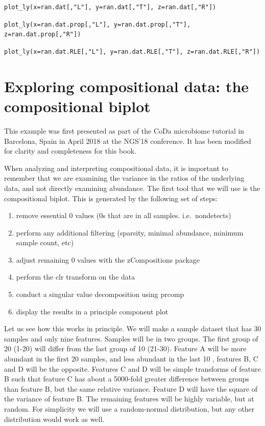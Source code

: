 \documentclass[
  onecolumn]{article}
\providecommand{\tightlist}{%
  \setlength{\itemsep}{0pt}\setlength{\parskip}{0pt}}
\begin{document}
\texttt{plot\_ly(x=ran.dat[,"L"], y=ran.dat[,"T"], z=ran.dat[,"R"])}

\texttt{plot\_ly(x=ran.dat.prop[,"L"], y=ran.dat.prop[,"T"], z=ran.dat.prop[,"R"])}

\texttt{plot\_ly(x=ran.dat.RLE[,"L"], y=ran.dat.RLE[,"T"], z=ran.dat.RLE[,"R"])}

\hypertarget{biplot}{%
\section{Exploring compositional data: the compositional biplot}\label{biplot}}

\hspace{2cm}\begin{minipage}[ct]{10cm}
\parskip=5pt
\parindent=5pt
This example was first presented as part of the CoDa microbiome tutorial in Barcelona, Spain in April 2018 at the NGS'18 conference.  It has been modified for clarity and completeness for this book.
\end{minipage}
\vspace{1cm}

When analyzing and interpreting compositional data, it is important to remember that we are examining the variance in the ratios of the underlying data, and not directly examining abundance. The first tool that we will use is the compositional biplot. This is generated by the following set of steps:

\begin{enumerate}
\def\labelenumi{\arabic{enumi}.}
\tightlist
\item
  remove essential 0 values (0s that are in all samples. i.e.~nondetects)
\item
  perform any additional filtering (sparsity, minimal abundance, minimum sample count, etc)
\item
  adjust remaining 0 values with the zCompositions package
\item
  perform the clr transform on the data
\item
  conduct a singular value decomposition using prcomp
\item
  display the results in a principle component plot
\end{enumerate}

Let us see how this works in principle. We will make a sample dataset that has 30 samples and only nine features. Samples will be in two groups. The first group of 20 (1-20) will differ from the last group of 10 (21-30). Feature A will be more abundant in the first 20 samples, and less abundant in the last 10 , features B, C and D will be the opposite. Features C and D will be simple transforms of feature B such that feature C has about a 5000-fold greater difference between groups than feature B, but the same relative variance. Feature D will have the square of the variance of feature B. The remaining features will be highly variable, but at random. For simplicity we will use a random-normal distribution, but any other distribution would work as well.
\end{document}
